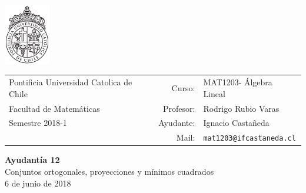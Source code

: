 \documentclass[12pt]{article}
\makeatletter
\newcommand{\ayudantia}{{\sc Ayudantía 12}}
\newcommand{\tituloayu}{Conjuntos ortogonales, proyecciones y mínimos cuadrados}
\newcommand{\fecha}{6 de junio de 2018}
\newcommand{\sigla}{MAT1203}
\newcommand{\nombre}{Álgebra Lineal}
\newcommand{\profesor}{Rodrigo Rubio Varas}
\newcommand{\ano}{2018}
\newcommand{\semestre}{1}
\newcommand{\mail}{mat1203@ifcastaneda.cl}
\makeatother
\begin{document}
\thispagestyle{empty}

\begin{minipage}{2cm}
	\includegraphics[width=2cm]{../../../../img/logo.pdf}
	\vspace{0.5cm}
\end{minipage}
\begin{minipage}{\linewidth}
	\begin{tabular}{lrl}
		{\scriptsize\sc Pontificia Universidad Catolica de Chile} & \hspace*{0.7in}Curso: &
		\sigla  - \nombre\\
		{\sc Facultad de Matemáticas}&
		Profesor: & \profesor \\
		{\sc Semestre \ano-\semestre} & Ayudante: & {Ignacio Castañeda}\\
		& {Mail:} & \texttt{\mail}
	\end{tabular}
\end{minipage}

\vspace{-10mm}
\begin{center}
	{\LARGE\bf \ayudantia}\\
	\vspace{0.1cm}
	{\tituloayu}\\
	\vspace{0.1cm}
	\fecha\\
	\vspace{0.4cm}
\end{center}
\end{document}
